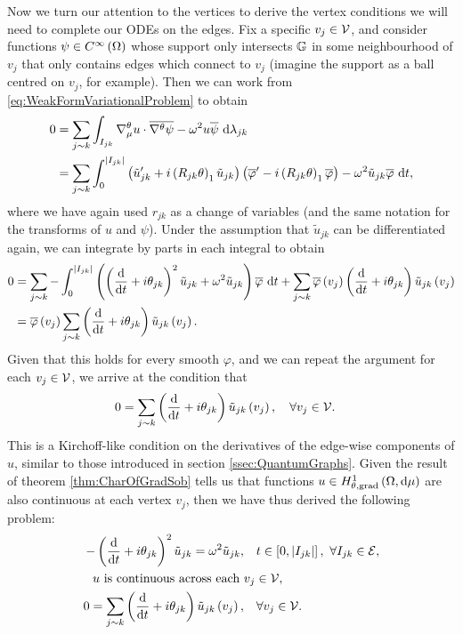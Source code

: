 Now we turn our attention to the vertices to derive the vertex conditions we will need to complete our ODEs on the edges. 
Fix a specific $v_j\in \mathcal{V}$, and consider functions $\psi\in C^{\infty}\left( \Omega \right)$ whose support only intersects $\mathbb{G}$ in some neighbourhood of $v_j$ that only contains edges which connect to $v_j$ (imagine the support as a ball centred on $v_j$, for example).
Then we can work from \eqref{eq:WeakFormVariationalProblem} to obtain
\begin{align*}
	0 &= \sum_{j\sim k} \int_{I_{jk}} \nabla^{\theta}_\mu u \cdot \overline{\nabla^{\theta}\psi} - \omega^2 u\overline{\psi}  \ \mathrm{d}\lambda_{jk} \\
	&= \sum_{j\sim k} \int_{0}^{\left\lvert I_{jk} \right\rvert} \left( \tilde{u}_{jk}' + i\left( R_{jk}\theta \right)_1 \tilde{u}_{jk} \right)\left( \overline{\varphi}' - i\left( R_{jk}\theta \right)_1 \overline{\varphi}  \right) - \omega^2 \tilde{u}_{jk}\overline{\varphi} \ \mathrm{d} t,
\end{align*}
where we have again used $r_{jk}$ as a change of variables (and the same notation for the transforms of $u$ and $\psi$).
Under the assumption that $\tilde{u}_{jk}$ can be differentiated again, we can integrate by parts in each integral to obtain
\begin{align*}
	0 &= \sum_{j\sim k} - \int_{0}^{\left\lvert I_{jk} \right\rvert} \left(  \left( \dfrac{\mathrm{d}}{\mathrm{d}t} + i\theta_{jk} \right)^2 \tilde{u}_{jk} +\omega^2 \tilde{u}_{jk}  \right)\overline{\varphi} \ \mathrm{d} t
	+ \sum_{j\sim k}\overline{\varphi}\left( v_j \right)\left( \dfrac{\mathrm{d}}{\mathrm{d}t} + i\theta_{jk} \right)\tilde{u}_{jk}\left( v_j \right) \\
	&= \overline{\varphi}\left( v_j \right)\sum_{j\sim k}\left( \dfrac{\mathrm{d}}{\mathrm{d}t} + i\theta_{jk} \right)\tilde{u}_{jk}\left( v_j \right).
\end{align*}
Given that this holds for every smooth $\varphi$, and we can repeat the argument for each $v_j\in \mathcal{V}$, we arrive at the condition that 
\begin{align*}
	0 &= \sum_{j\sim k}\left( \dfrac{\mathrm{d}}{\mathrm{d}t} + i\theta_{jk} \right)\tilde{u}_{jk}\left( v_j \right), \quad \forall v_j \in \mathcal{V}.
\end{align*}
This is a Kirchoff-like condition on the derivatives of the edge-wise components of $u$, similar to those introduced in section \ref{ssec:QuantumGraphs}.
Given the result of theorem \ref{thm:CharOfGradSob} tells us that functions $u\in H^1_{\theta, \mathrm{grad}}\left( \Omega, \mathrm{d}\mu \right)$ are also continuous at each vertex $v_j$, then we have thus derived the following problem:
\begin{align*}
	-\left( \dfrac{\mathrm{d}}{\mathrm{d}t} + i\theta_{jk} \right)^2 \tilde{u}_{jk} = \omega^2 \tilde{u}_{jk}, &\quad t\in\left[ 0,\left\lvert I_{jk} \right\rvert \right], \ \forall I_{jk}\in \mathcal{E}, \\
	u \text{ is continuous across each } &v_j \in \mathcal{V}, \\
	0 = \sum_{j\sim k}\left( \dfrac{\mathrm{d}}{\mathrm{d}t} + i\theta_{jk} \right)\tilde{u}_{jk}\left( v_j \right), &\quad \forall v_j \in \mathcal{V}.
\end{align*}

